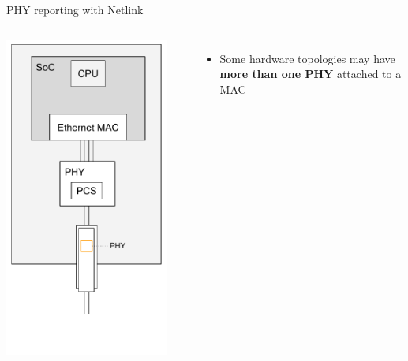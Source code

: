 \begin{frame}{PHY reporting with Netlink}
	\begin{columns}
		\includegraphics[width=0.9\textwidth]{slides/networking-driver-phy/one-media-converter-one-phy-one-mac.pdf}
	\begin{itemize}
		\item Some hardware topologies may have \textbf{more than one PHY} attached to a MAC
			\begin{itemize}

\end{itemize}
\end{itemize}
\end{columns}
\end{frame}
